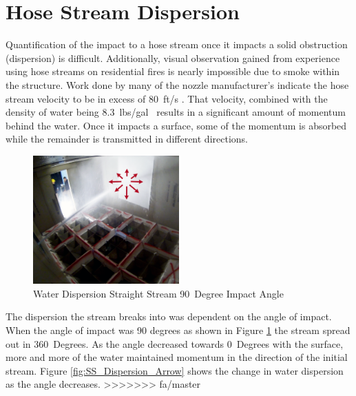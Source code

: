 \documentclass[12pt,oneside]{book}
\begin{document}
\section{Hose Stream Dispersion}

Quantification of the impact to a hose stream once it impacts a solid obstruction (dispersion) is difficult. Additionally, visual observation gained from experience using hose streams on residential fires is nearly impossible due to smoke within the structure. Work done by many of the nozzle manufacturer's indicate the hose stream velocity to be in excess of 80~ft/s \cite{NBFU:EffectiveReach}. That velocity, combined with the density of water being 8.3~lbs/gal~\cite{SFPEHandbookPurser} results in a significant amount of momentum behind the water. Once it impacts a surface, some of the momentum is absorbed while the remainder is transmitted in different directions. 

\begin{figure}[H]
\centering
\includegraphics[width=0.5\textwidth]{Figures/Water_Distribution/Nozzle_Directions/Exterior_AtWall_SB_Arrows.png}
\caption{Water Dispersion Straight Stream 90~Degree Impact Angle}
\label{fig:90DegreeImpact}
\end{figure}

The dispersion the stream breaks into was dependent on the angle of impact. When the angle of impact was 90 degrees as shown in Figure \ref{fig:90DegreeImpact} the stream spread out in 360~Degrees. As the angle decreased towards 0~Degrees with the surface, more and more of the water maintained momentum in the direction of the initial stream. Figure \ref{fig:SS_Dispersion_Arrow} shows the change in water dispersion as the angle decreases. 
>>>>>>> fa/master
\end{document}
